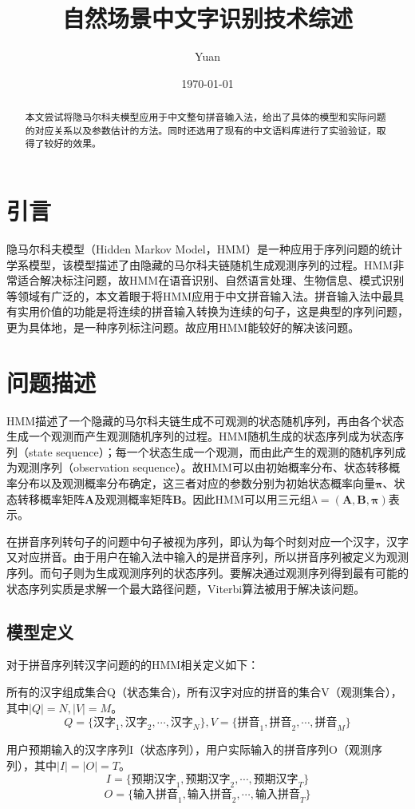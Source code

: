\documentclass[12pt,a4paper]{ctexart}
\title{自然场景中文字识别技术综述}
\author{Yuan}
\date{\small\today}
\begin{document}
\maketitle
\begin{abstract}
本文尝试将隐马尔科夫模型应用于中文整句拼音输入法，给出了具体的模型和实际问题的对应关系以及参数估计的方法。同时还选用了现有的中文语料库进行了实验验证，取得了较好的效果。
\end{abstract}	
\section{引言}
隐马尔科夫模型（Hidden Markov Model，HMM）是一种应用于序列问题的统计学系模型，该模型描述了由隐藏的马尔科夫链随机生成观测序列的过程。HMM非常适合解决标注问题，故HMM在语音识别、自然语言处理、生物信息、模式识别等领域有广泛的\cite{李航统计学习}，本文着眼于将HMM应用于中文拼音输入法。拼音输入法中最具有实用价值的功能是将连续的拼音输入转换为连续的句子，这是典型的序列问题，更为具体地，是一种序列标注问题。故应用HMM能较好的解决该问题。
\section{问题描述}
HMM描述了一个隐藏的马尔科夫链生成不可观测的状态随机序列，再由各个状态生成一个观测而产生观测随机序列的过程。HMM随机生成的状态序列成为状态序列（state sequence）；每一个状态生成一个观测，而由此产生的观测的随机序列成为观测序列（observation sequence）。故HMM可以由初始概率分布、状态转移概率分布以及观测概率分布确定，这三者对应的参数分别为初始状态概率向量$ \bm{\pi} $、状态转移概率矩阵$\bm{A}$及观测概率矩阵$\bm{B}$。因此HMM可以用三元组$ \lambda=(\bm{A},\bm{B},\bm{\pi}) $表示\cite{李航统计学习}。

在拼音序列转句子的问题中句子被视为序列，即认为每个时刻对应一个汉字，汉字又对应拼音。由于用户在输入法中输入的是拼音序列，所以拼音序列被定义为观测序列。而句子则为生成观测序列的状态序列。要解决通过观测序列得到最有可能的状态序列实质是求解一个最大路径问题，Viterbi算法\cite{viterbi2006a}被用于解决该问题。
\subsection{模型定义}
对于拼音序列转汉字问题的的HMM相关定义如下：


所有的汉字组成集合Q（状态集合)，所有汉字对应的拼音的集合V（观测集合），其中$ |Q|=N, |V|=M $。
\[ Q=\{ \mbox{汉字}_1,\mbox{汉字}_2,\cdots,\mbox{汉字}_N \},V=\{ \mbox{拼音}_1,\mbox{拼音}_2,\cdots,\mbox{拼音}_M \}  \]

用户预期输入的汉字序列I（状态序列），用户实际输入的拼音序列O（观测序列），其中$ |I|=|O|=T $。
\[ I=\{ \mbox{预期汉字}_1,\mbox{预期汉字}_2,\cdots,\mbox{预期汉字}_T \}	\]
\[O=\{ \mbox{输入拼音}_1,\mbox{输入拼音}_2,\cdots,\mbox{输入拼音}_T \}  \]
\end{document}
